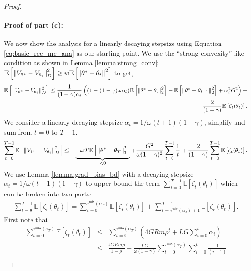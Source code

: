 \documentclass{colt2018} %
\DeclareMathOperator*{\mix}{mix}
\begin{document}
\begin{proof}
\paragraph{Proof of part (c):} We now show the analysis for a linearly decaying stepsize using Equation \eqref{eq:basic_rec_mc_ana} as our starting point. We use the ``strong convexity'' like condition as shown in Lemma \ref{lemma:strong_conv}: $\mathbb{E}\left[\norm{V_{\theta^*} - V_{\theta_t}}^2_{D}\right] \geq w \mathbb{E}\left[ \norm{\theta^* - \theta_t}^2 \right]$ to get,
\begin{eqnarray*}
\mathbb{E}\left[\norm{V_{\theta^*} - V_{\theta_t}}^2_{D}\right] \leq \frac{1}{(1-\gamma)\alpha_t} \left((1-(1-\gamma)\omega \alpha_t) \mathbb{E}\left[\norm{\theta^* - \theta_t}_2^2\right] - \mathbb{E}\left[\norm{\theta^* - \theta_{t+1}}_2^2\right] + \alpha_t^2 G^2 \right) + \\
\frac{2}{(1-\gamma)} \mathbb{E}\left[\zeta_t(\theta_t)\right]. 
\end{eqnarray*}
We consider a linearly decaying stepsize $\alpha_t = 1/\omega (t+1) (1-\gamma)$, simplify and sum from $t=0$ to $T-1$.
\begin{eqnarray}
\sum_{t=0}^{T-1} \mathbb{E}\left[\norm{V_{\theta^*} - V_{\theta_t}}^2_{D}\right] &\leq& \underbrace{-\omega T \mathbb{E}\left[ \norm{\theta^* - \theta_T}_2^2 \right]}_{< 0} + \frac{G^2}{\omega (1-\gamma)^2} \sum_{t=0}^{T-1} \frac{1}{t} + \frac{2}{(1-\gamma)} \sum_{t=0}^{T-1} \mathbb{E}\left[\zeta_t(\theta_t)\right]. \nonumber\\ \label{eq:mc_ana_rec_partb}
\end{eqnarray}
We use Lemma \ref{lemma:grad_bias_bd} with a decaying stepsize $\alpha_t = 1/\omega (t+1) (1-\gamma)$ to upper bound the term $\sum_{t=0}^{T-1} \mathbb{E}\left[\zeta_t(\theta_t)\right]$ which can be broken into two parts:
\begin{eqnarray}
\sum_{t=0}^{T-1} \mathbb{E}\left[\zeta_t(\theta_t)\right] = \sum_{t=0}^{\tau^{\mix}(\alpha_T)} \mathbb{E}\left[\zeta_t(\theta_t)\right] + \sum_{t=\tau^{\mix}(\alpha_T) + 1}^{T-1} \mathbb{E}\left[\zeta_t(\theta_t)\right].
\end{eqnarray}
First note that
\begin{eqnarray*}
\sum_{t=0}^{\tau^{\mix}(\alpha_T)} \mathbb{E}\left[\zeta_t(\theta_t)\right] &\leq& \sum_{t=0}^{\tau^{\mix}(\alpha_T)} \left( 4GR m \rho^t + LG \sum_{i=0}^t \alpha_i \right) \\
&\leq& \frac{4GR m \rho}{1-\rho} + \frac{LG}{\omega(1-\gamma)} \sum_{t=0}^{\tau^{\mix}(\alpha_T)} \sum_{i=0}^t \frac{1}{(i+1)} \\

\end{eqnarray*}
\end{proof}
\end{document}
